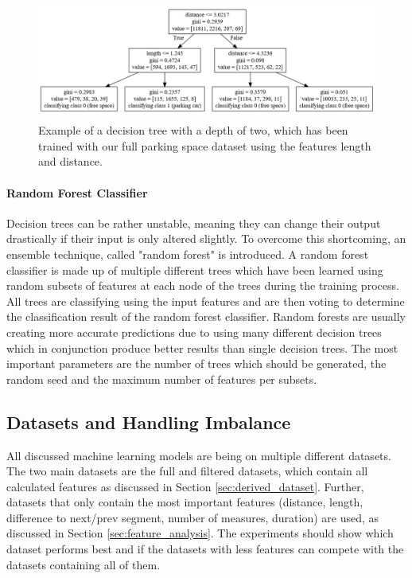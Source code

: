 \begin{figure}
	\centering
	\includegraphics[width=\textwidth]{img/decision_tree2.PNG}

	\caption{Example of a decision tree with a depth of two, which has been trained with our full parking space dataset using the features length and distance.}
	\label{fig:decision_tree}
\end{figure}





\paragraph{Random Forest Classifier}

Decision trees can be rather unstable, meaning they can change their output drastically if their input is only altered slightly. To overcome this shortcoming, an ensemble technique, called "random forest" is introduced. A random forest classifier is made up of multiple different trees which have been learned using random subsets of features at each node of the trees during the training process. All trees are classifying using the input features and are then voting to determine the classification result of the random forest classifier. Random forests are usually creating more accurate predictions due to using many different decision trees which in conjunction produce better results than single decision trees. The most important parameters are the number of trees which should be generated, the random seed and the maximum number of features per subsets.





\subsection{Datasets and Handling Imbalance}
\label{sec:tested_datasets_and_handling_imbalance}

All discussed machine learning models are being on multiple different datasets. The two main datasets are the full and filtered datasets, which contain all calculated features as discussed in Section \ref{sec:derived_dataset}. Further, datasets that only contain the most important features (distance, length, difference to next/prev segment, number of measures, duration) are used, as discussed in Section \ref{sec:feature_analysis}. The experiments should show which dataset performs best and if the datasets with less features can compete with the datasets containing all of them.

